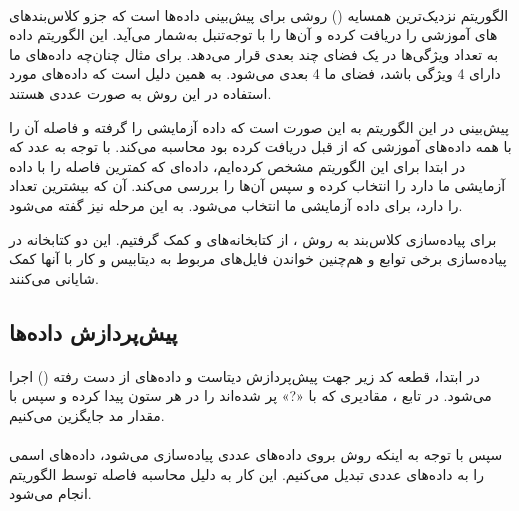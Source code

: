 \documentclass[a4paper,12pt]{article}
\begin{document}
\paragraph{}
الگوریتم  نزدیک‌ترین همسایه () روشی برای پیش‌بینی  داده‌ها است که جزو کلاس‌بندهای تنبل به‌شمار می‌آید. این الگوریتم داده‌‎های آموزشی را دریافت کرده و آن‌ها را با توجه به تعداد ویژگی‌ها در یک فضای چند بعدی قرار می‌دهد. برای مثال چنان‌چه داد‌ه‌های ما دارای 4 ویژگی باشد، فضای ما 4 بعدی می‌شود. به همین دلیل است که داده‌های مورد استفاده در این روش به صورت عددی هستند.

پیش‌بینی در این الگوریتم به این صورت است که داده آزمایشی را گرفته و فاصله آن را با همه داده‌های آموزشی که از قبل دریافت کرده بود محاسبه می‌کند. با توجه به عدد  که در ابتدا برای این الگوریتم مشخص کرده‌ایم،  داده‌ای که کمترین فاصله را با داده آزمایشی ما دارد را انتخاب کرده و سپس  آن‌ها را بررسی می‌کند. آن  که بیشترین تعداد را دارد، برای  داده آزمایشی ما انتخاب می‌شود. به این مرحله  نیز گفته می‌شود.

برای پیاده‌سازی کلاس‌بند به روش ، از کتابخانه‌های  و  کمک گرفتیم. این دو کتابخانه در پیاده‌سازی برخی توابع و هم‌چنین خواندن فایل‌های مربوط به دیتابیس و کار با آنها کمک شایانی می‌کنند.

\subsection{پیش‌پردازش داده‌ها}
\paragraph{}
در ابتدا، قطعه کد زیر جهت پیش‌پردازش دیتاست و داده‌های از دست رفته
 () اجرا می‌شود.
  در تابع ، مقادیری که با «?» پر شده‌اند را در هر ستون پیدا کرده و سپس با مقدار مد جایگزین می‌کنیم.

\begin{flushleft}
\end{flushleft}

\paragraph{}
سپس با توجه به اینکه روش  بروی داده‌های عددی پیاده‌سازی می‌شود، داده‌های اسمی را به داده‌های عددی تبدیل می‌کنیم. این کار به دلیل محاسبه فاصله توسط الگوریتم  انجام می‌شود.
\end{document}
